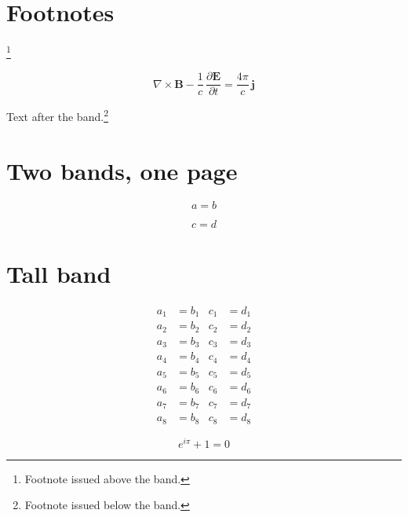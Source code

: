 \documentclass[twocolumn]{article}
\begin{document}
\section{Footnotes}
\lipsum[1][1-4]\footnote{Footnote issued above the band.}
\lipsum[1][5-8]

\begin{wideband}
\begin{equation}
  \nabla\times\mathbf{B} - \frac1c\,\frac{\partial\mathbf E}{\partial t}
   = \frac{4\pi}{c}\,\mathbf{j}
\end{equation}
\end{wideband}

Text after the band.\footnote{Footnote issued below the band.}
\lipsum[2-4]

\clearpage
\section{Two bands, one page}
\lipsum[1][1-3]
\begin{wideband}\begin{equation}a=b\end{equation}\end{wideband}
\lipsum[1][4-6]
\begin{wideband}\begin{equation}c=d\end{equation}\end{wideband}
\lipsum[2-3]

\clearpage
\section{Tall band}
\lipsum[1][1-2]
\begin{wideband}
\begin{align}
  a_1 &= b_1 & c_1 &= d_1\\ a_2 &= b_2 & c_2 &= d_2\\
  a_3 &= b_3 & c_3 &= d_3\\ a_4 &= b_4 & c_4 &= d_4\\
  a_5 &= b_5 & c_5 &= d_5\\ a_6 &= b_6 & c_6 &= d_6\\
  a_7 &= b_7 & c_7 &= d_7\\ a_8 &= b_8 & c_8 &= d_8
\end{align}
\end{wideband}
\lipsum[2-5]

\clearpage
\begin{wideband}
\begin{equation}
  e^{i\pi}+1=0
\end{equation}
\end{wideband}
\lipsum[6-9]
\end{document}
